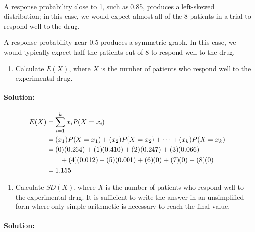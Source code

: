 \documentclass[11pt]{article}
\providecommand{\tightlist}{%
      \setlength{\itemsep}{0pt}\setlength{\parskip}{0pt}}
\begin{document}
    
    
    
    \begin{center}
    \end{center}
    { \hspace*{\fill} \\}
    
    A response probability close to 1, such as 0.85, produces a left-skewed
distribution; in this case, we would expect almost all of the 8 patients
in a trial to respond well to the drug.

A response probability near 0.5 produces a symmetric graph. In this
case, we would typically expect half the patients out of 8 to respond
well to the drug.

    \begin{enumerate}
\def\labelenumi{\alph{enumi})}
\setcounter{enumi}{4}
\tightlist
\item
  Calculate \(E(X)\), where \(X\) is the number of patients who respond
  well to the experimental drug.
\end{enumerate}

    \hypertarget{solution}{%
\paragraph{Solution:}\label{solution}}

\begin{align*}
E(X)    &= \sum_{i=1}^{k}x_iP(X=x_i) \notag \\
    &= (x_1)P(X = x_1) + (x_2)P(X = x_2) + \cdots + (x_k)P(X = x_k) \\
    &= (0)(0.264) + (1)(0.410) + (2)(0.247) + (3)(0.066) \\
    & \qquad + (4)(0.012) + (5)(0.001) + (6)(0) + (7)(0) + (8)(0) \\
    &= 1.155
\end{align*}

    \begin{enumerate}
\def\labelenumi{\alph{enumi})}
\setcounter{enumi}{5}
\tightlist
\item
  Calculate \(SD(X)\), where \(X\) is the number of patients who respond
  well to the experimental drug. It is sufficient to write the answer in
  an unsimplified form where only simple arithmetic is necessary to
  reach the final value.
\end{enumerate}

    \hypertarget{solution}{%
\paragraph{Solution:}\label{solution}}
\end{document}
